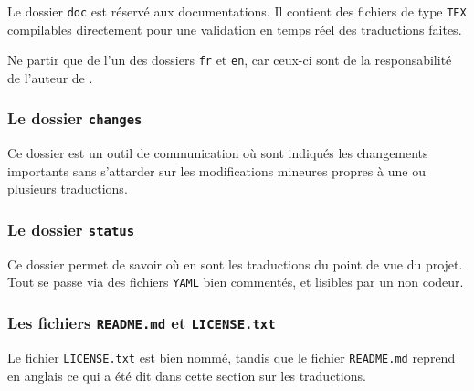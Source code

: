 \documentclass[10pt, a4paper]{../main/main}
\begin{document}
\begin{tdocnote}
	Le dossier \verb#doc# est réservé aux documentations. Il contient des fichiers de type \verb#TEX# compilables directement pour une validation en temps réel des traductions faites.
\end{tdocnote}


\begin{tdocwarn}
	Ne partir que de l'un des dossiers \verb#fr# et \verb#en#, car ceux-ci sont de la responsabilité de l'auteur de \thisproj.
\end{tdocwarn}


\subsubsection{Le dossier \texttt{changes}}

Ce dossier est un outil de communication où sont indiqués les changements importants sans s'attarder sur les modifications mineures propres à une ou plusieurs traductions.



\subsubsection{Le dossier \texttt{status}}

Ce dossier permet de savoir où en sont les traductions du point de vue du projet. Tout se passe via des fichiers \verb#YAML# bien commentés, et lisibles par un non codeur.



\subsubsection{Les fichiers \texttt{README.md} et \texttt{LICENSE.txt}}

Le fichier \texttt{LICENSE.txt} est bien nommé, tandis que le fichier \texttt{README.md} reprend en anglais ce qui a été dit dans cette section sur les traductions.
\end{document}
